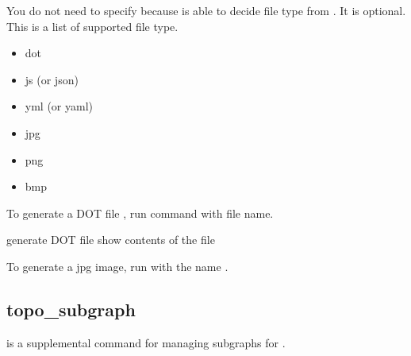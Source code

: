 \documentclass[a4paper,11pt,openany,oneside,english]{sphinxmanual}
\begin{document}
You do not need to specify  because  is able to
decide file type from . It is optional.
This is a list of supported file type.
\begin{itemize}
\item {} 
dot

\item {} 
js (or json)

\item {} 
yml (or yaml)

\item {} 
jpg

\item {} 
png

\item {} 
bmp

\end{itemize}

To generate a DOT file , run  command with
file name.

\begin{sphinxVerbatim}[commandchars=\\\{\},formatcom=\footnotesize]
 generate DOT file
 show contents of the file
\end{sphinxVerbatim}

To generate a jpg image, run  with the name .

\begin{sphinxVerbatim}[commandchars=\\\{\},formatcom=\footnotesize]
\end{sphinxVerbatim}


\subsection{topo\_subgraph}
\label{\detokenize{commands/experimental:topo-subgraph}}\label{\detokenize{commands/experimental:commands-experimental-topo-subgraph}}
 is a supplemental command for managing subgraphs
for .
\end{document}
